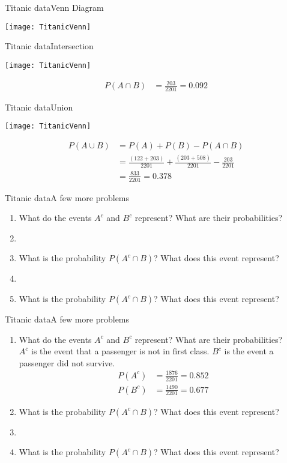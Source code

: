 \documentclass[xcolor=dvipsnames]{beamer}
\begin{document}
\begin{frame}{Titanic data}{Venn Diagram}
	\begin{center}
		\texttt{[image: TitanicVenn]}
	\end{center}
\end{frame}

\begin{frame}{Titanic data}{Intersection}
\begin{center}
	\texttt{[image: TitanicVenn]}
\end{center}
\begin{align*}
P(A \cap B) &= \frac{203}{2201} = 0.092
\end{align*}
\end{frame}

\begin{frame}{Titanic data}{Union}
\begin{center}
	\texttt{[image: TitanicVenn]}
\end{center}
\begin{align*}
	P(A \cup B) &= P(A) + P(B) - P(A\cap B)\\
	&= \frac{(122 + 203)}{2201} + \frac{(203 + 508)}{2201} - \frac{203}{2201} \\
	&= \frac{833}{2201} = 0.378
\end{align*}
\end{frame}

\begin{frame}{Titanic data}{A few more problems}
	\begin{enumerate}
		\item What do the events $A^c$ and $B^c$ represent? What are their probabilities?
		\item[]
		\item What is the probability $P(A^c \cap B)$? What does this event represent?
		\item[] 
		\item What is the probability $P(A^c \cap B)$? What does this event represent?
	\end{enumerate}
\end{frame}

\begin{frame}{Titanic data}{A few more problems}
\begin{enumerate}
	\item What do the events $A^c$ and $B^c$ represent? What are their probabilities?\\
	$A^c$ is the event that a passenger is not in first class. $B^c$ is the event a passenger did not survive. 
	\begin{align*}
		P(A^c) &= \frac{1876}{2201} = 0.852 \\
		P(B^c) &= \frac{1490}{2201} = 0.677
	\end{align*}
	\item What is the probability $P(A^c \cap B)$? What does this event represent?
	\item[] 
	\item What is the probability $P(A^c \cap B)$? What does this event represent?
\end{enumerate}
\end{frame}
\end{document}
